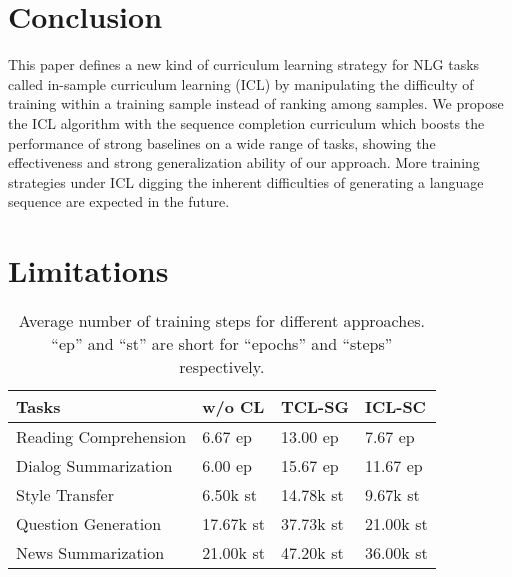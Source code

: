 \section{Conclusion}

This paper defines a new kind of curriculum learning strategy for NLG tasks called in-sample curriculum learning (ICL) by manipulating the difficulty of training within a training sample instead of ranking among samples. We propose the ICL algorithm with the sequence completion curriculum which boosts the performance of strong baselines on a wide range of tasks, showing the effectiveness and strong generalization ability of our approach. More training strategies under ICL digging the inherent difficulties of generating a language sequence are expected in the future.



\section{Limitations}

\begin{table} [h]
	\scriptsize
	\centering
	\begin{tabular}{p{2.5cm}p{1cm}p{1cm}p{1cm}}
		\hline
		{Tasks} & {w/o CL} & {TCL-SG} & {ICL-SC} \\
		\hline
		Reading Comprehension  &6.67 ep & 13.00 ep & 7.67 ep \\
		Dialog Summarization &6.00 ep &15.67 ep & 11.67 ep\\
		Style Transfer &6.50k st & 14.78k st & 9.67k st  \\
		Question Generation & 17.67k st& 37.73k st  & 21.00k st  \\
		News Summarization &21.00k st  & 47.20k st &36.00k st\\

		\hline
	\end{tabular}
	\caption{Average number of training steps for different approaches. ``ep'' and ``st'' are short for ``epochs'' and ``steps'' respectively.}
	\label{tab:humaneval}
\end{table}


